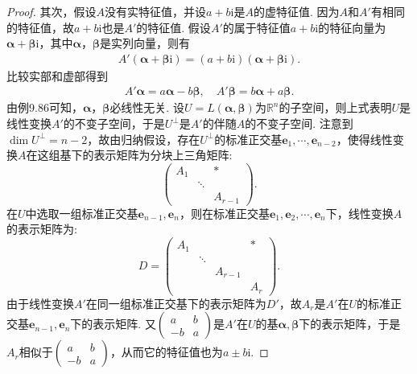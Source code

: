 \documentclass[../../main.tex]{subfiles}%
\begin{document}
\begin{proof}
其次，假设\(A\)没有实特征值，并设\(a + b\mathrm{i}\)是\(A\)的虚特征值. 因为\(A\)和\(A'\)有相同的特征值，故\(a + b\mathrm{i}\)也是\(A'\)的特征值. 假设\(A'\)的属于特征值\(a + b\mathrm{i}\)的特征向量为\(\boldsymbol{\alpha}+ \boldsymbol{\beta}\mathrm{i}\)，其中\(\boldsymbol{\alpha}\)，\(\boldsymbol{\beta}\)是实列向量，则有
\begin{align*}
A'(\boldsymbol{\alpha}+ \boldsymbol{\beta}\mathrm{i})=(a + b\mathrm{i})(\boldsymbol{\alpha}+ \boldsymbol{\beta}\mathrm{i}).
\end{align*}
比较实部和虚部得到
\begin{align*}
A'\boldsymbol{\alpha}=a\boldsymbol{\alpha}-b\boldsymbol{\beta},\quad A'\boldsymbol{\beta}=b\boldsymbol{\alpha}+a\boldsymbol{\beta}.
\end{align*}
由例9.86可知，\(\boldsymbol{\alpha}\)，\(\boldsymbol{\beta}\)必线性无关. 设\(U = L(\boldsymbol{\alpha},\boldsymbol{\beta})\)为\(\mathbb{R}^n\)的子空间，则上式表明\(U\)是线性变换\(A'\)的不变子空间，于是\(U^\perp\)是\(A'\)的伴随\(A\)的不变子空间. 注意到\(\dim U^\perp=n - 2\)，故由归纳假设，存在\(U^\perp\)的标准正交基\(\boldsymbol{e}_1,\cdots,\boldsymbol{e}_{n - 2}\)，使得线性变换\(A\)在这组基下的表示矩阵为分块上三角矩阵:
\[
\begin{pmatrix}
A_1 & & * \\
& \ddots & \\
& & A_{r - 1}
\end{pmatrix}.
\]
在\(U\)中选取一组标准正交基\(\boldsymbol{e}_{n - 1},\boldsymbol{e}_n\)，则在标准正交基\(\boldsymbol{e}_1,\boldsymbol{e}_2,\cdots,\boldsymbol{e}_n\)下，线性变换\(A\)的表示矩阵为:
\[
D = 
\begin{pmatrix}
A_1 & & & * \\
& \ddots & & \\
& & A_{r - 1} & \\
& & & A_r
\end{pmatrix}.
\]
由于线性变换\(A'\)在同一组标准正交基下的表示矩阵为\(D'\)，故\(A_r\)是\(A'\)在\(U\)的标准正交基\(\boldsymbol{e}_{n - 1},\boldsymbol{e}_n\)下的表示矩阵. 又\(\begin{pmatrix}a&b\\-b&a\end{pmatrix}\)是\(A'\)在\(U\)的基\(\boldsymbol{\alpha},\boldsymbol{\beta}\)下的表示矩阵，于是\(A_r\)相似于\(\begin{pmatrix}a&b\\-b&a\end{pmatrix}\)，从而它的特征值也为\(a\pm b\mathrm{i}\). 

\end{proof}
\end{document}
